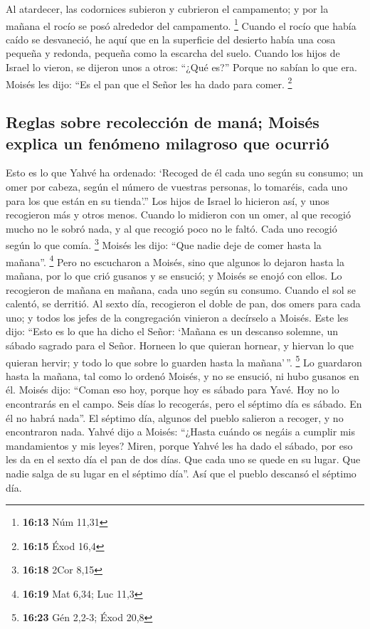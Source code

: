  Al atardecer, las codornices subieron y cubrieron el
campamento; y por la mañana el rocío se posó alrededor del campamento.
\footnote{\textbf{16:13} Núm 11,31}  Cuando el rocío que
había caído se desvaneció, he aquí que en la superficie del desierto
había una cosa pequeña y redonda, pequeña como la escarcha del suelo.
 Cuando los hijos de Israel lo vieron, se dijeron unos a
otros: ``¿Qué es?'' Porque no sabían lo que era. Moisés les dijo: ``Es
el pan que el Señor les ha dado para comer. \footnote{\textbf{16:15}
  Éxod 16,4}

\hypertarget{reglas-sobre-recolecciuxf3n-de-manuxe1-moisuxe9s-explica-un-fenuxf3meno-milagroso-que-ocurriuxf3}{%
\subsection{Reglas sobre recolección de maná; Moisés explica un fenómeno
milagroso que
ocurrió}\label{reglas-sobre-recolecciuxf3n-de-manuxe1-moisuxe9s-explica-un-fenuxf3meno-milagroso-que-ocurriuxf3}}

 Esto es lo que Yahvé ha ordenado: `Recoged de él cada
uno según su consumo; un omer por cabeza, según el número de vuestras
personas, lo tomaréis, cada uno para los que están en su tienda'.''
 Los hijos de Israel lo hicieron así, y unos recogieron
más y otros menos.  Cuando lo midieron con un omer, al
que recogió mucho no le sobró nada, y al que recogió poco no le faltó.
Cada uno recogió según lo que comía. \footnote{\textbf{16:18} 2Cor 8,15}
 Moisés les dijo: ``Que nadie deje de comer hasta la
mañana''. \footnote{\textbf{16:19} Mat 6,34; Luc 11,3} 
Pero no escucharon a Moisés, sino que algunos lo dejaron hasta la
mañana, por lo que crió gusanos y se ensució; y Moisés se enojó con
ellos.  Lo recogieron de mañana en mañana, cada uno según
su consumo. Cuando el sol se calentó, se derritió.  Al
sexto día, recogieron el doble de pan, dos omers para cada uno; y todos
los jefes de la congregación vinieron a decírselo a Moisés.
 Este les dijo: ``Esto es lo que ha dicho el Señor:
`Mañana es un descanso solemne, un sábado sagrado para el Señor. Horneen
lo que quieran hornear, y hiervan lo que quieran hervir; y todo lo que
sobre lo guarden hasta la mañana'\,''. \footnote{\textbf{16:23} Gén
  2,2-3; Éxod 20,8}  Lo guardaron hasta la mañana, tal
como lo ordenó Moisés, y no se ensució, ni hubo gusanos en él.
 Moisés dijo: ``Coman eso hoy, porque hoy es sábado para
Yavé. Hoy no lo encontrarás en el campo.  Seis días lo
recogerás, pero el séptimo día es sábado. En él no habrá nada''.
 El séptimo día, algunos del pueblo salieron a recoger, y
no encontraron nada.  Yahvé dijo a Moisés: ``¿Hasta
cuándo os negáis a cumplir mis mandamientos y mis leyes? 
Miren, porque Yahvé les ha dado el sábado, por eso les da en el sexto
día el pan de dos días. Que cada uno se quede en su lugar. Que nadie
salga de su lugar en el séptimo día''.  Así que el pueblo
descansó el séptimo día.

